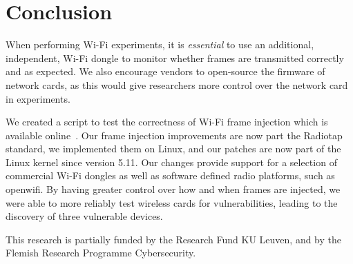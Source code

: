 \documentclass[sigconf]{acmart}
\newcommand{\wifi}{\mbox{Wi-Fi}}
\newcommand{\red}[1]{\textcolor{red}{#1}}
\begin{document}
\section{Conclusion}
\label{sec:conclusion}

When performing \wifi{} experiments, it is \emph{essential} to use an additional, independent, \wifi{} dongle to monitor whether frames are transmitted correctly and as expected.
We also encourage vendors to open-source the firmware of network cards, as this would give researchers more control over the network card in experiments.

We created a script to test the correctness of \wifi{} frame injection which is available online~\cite{repository}.
Our frame injection improvements are now part the Radiotap standard, we implemented them on Linux, and our patches are now part of the Linux kernel since version 5.11.
Our changes provide support for a selection of commercial \wifi{} dongles as well as software defined radio platforms, such as openwifi.
By having greater control over how and when frames are injected, we were able to more reliably test wireless cards for vulnerabilities, leading to the discovery of three vulnerable devices.




\vspace{-0.05cm}
\begin{acks}
This research is partially funded by the Research Fund KU Leuven, and by the Flemish Research Programme Cybersecurity.
\end{acks}

\vspace{-0.05cm}



\end{document}

